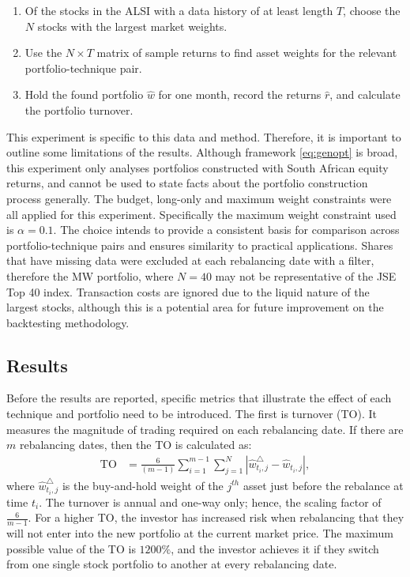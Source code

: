\documentclass[
]{article}
\begin{document}
\begin{enumerate}
\def\labelenumi{\arabic{enumi}.}
\item
  Of the stocks in the ALSI with a data history of at least length \(T\), choose the \(N\) stocks with the
  largest market weights.
\item
  Use the \(N \times T\) matrix of sample returns to find asset weights for the relevant
  portfolio-technique pair.
\item
  Hold the found portfolio \(\hat{w}\) for one month, record the returns \(\hat{r}\), and calculate the
  portfolio turnover.
\end{enumerate}

This experiment is specific to this data and method. Therefore, it is important to outline some
limitations of the results. Although framework \eqref{eq:genopt} is broad, this experiment only analyses
portfolios constructed with South African equity returns, and cannot be used to state facts about the
portfolio construction process generally. The budget, long-only and maximum weight constraints were all
applied for this experiment. Specifically the maximum weight constraint used is \(\alpha = 0.1\). The
choice intends to provide a consistent basis for comparison across portfolio-technique pairs and
ensures similarity to practical applications. Shares that have missing data were excluded at each
rebalancing date with a filter, therefore the MW portfolio, where \(N = 40\) may not be representative of
the JSE Top 40 index. Transaction costs are ignored due to the liquid nature of the largest stocks,
although this is a potential area for future improvement on the backtesting methodology.

\hypertarget{results}{%
\subsection{Results}\label{results}}

Before the results are reported, specific metrics that illustrate the effect of each technique and
portfolio need to be introduced. The first is turnover (TO). It measures the magnitude of trading
required on each rebalancing date. If there are \(m\) rebalancing dates, then the TO is calculated as:
\begin{align}
\text{TO} & = \frac{6}{(m - 1)} \sum_{i = 1}^{m - 1} \sum_{j =1}^{N} |\hat{w}_{t_i, j}^\triangle - \hat{w}_{t_i, j}|,
\end{align}
where \(\hat{w}_{t_i, j}^\triangle\) is the buy-and-hold weight of the \(j^{th}\) asset just before the
rebalance at time \(t_i\). The turnover is annual and one-way only; hence, the scaling factor of
\(\frac{6}{m-1}\). For a higher TO, the investor has increased risk when rebalancing that they will not
enter into the new portfolio at the current market price. The maximum possible value of the TO is
\(1200\%\), and the investor achieves it if they switch from one single stock portfolio to another at
every rebalancing date.
\end{document}
